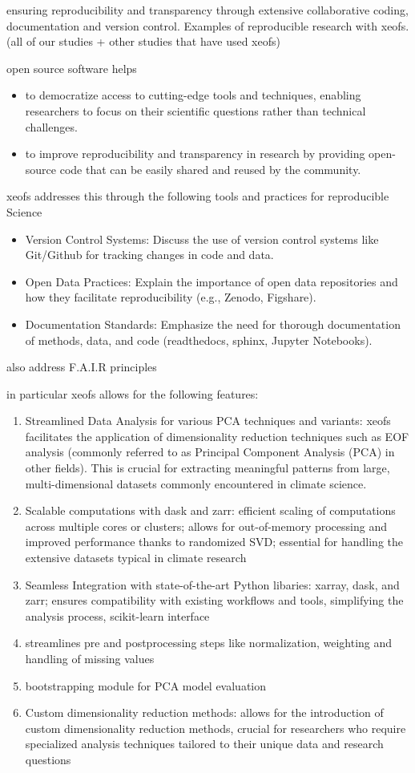 ensuring reproducibility and transparency through extensive collaborative coding, documentation and version control.
Examples of reproducible research with xeofs. (all of our studies + other studies that have used xeofs)


open source software helps 
\begin{itemize}
    \item to democratize access to cutting-edge tools and techniques, enabling researchers to focus on their scientific questions rather than technical challenges.
    \item to improve reproducibility and transparency in research by providing open-source code that can be easily shared and reused by the community.
\end{itemize}


xeofs addresses this through the following tools and practices for reproducible Science
\begin{itemize}
    \item Version Control Systems: Discuss the use of version control systems like Git/Github for tracking changes in code and data.
    \item Open Data Practices: Explain the importance of open data repositories and how they facilitate reproducibility (e.g., Zenodo, Figshare).
    \item Documentation Standards: Emphasize the need for thorough documentation of methods, data, and code (readthedocs, sphinx, Jupyter Notebooks).
\end{itemize}
also address F.A.I.R principles


in particular xeofs allows for the following features:
\begin{enumerate}
    \item Streamlined Data Analysis for various PCA techniques and variants: xeofs facilitates the application of dimensionality reduction techniques such as EOF analysis (commonly referred to as Principal Component Analysis (PCA) in other fields). This is crucial for extracting meaningful patterns from large, multi-dimensional datasets commonly encountered in climate science.
    \item Scalable computations with dask and zarr: efficient scaling of computations across multiple cores or clusters; allows for out-of-memory processing and improved performance thanks to randomized SVD; essential for handling the extensive datasets typical in climate research
    \item Seamless Integration with state-of-the-art Python libaries: xarray, dask, and zarr; ensures compatibility with existing workflows and tools, simplifying the analysis process, scikit-learn interface
    \item streamlines pre and postprocessing steps like normalization, weighting and handling of missing values
    \item bootstrapping module for PCA model evaluation
    \item Custom dimensionality reduction methods: allows for the introduction of custom dimensionality reduction methods, crucial for researchers who require specialized analysis techniques tailored to their unique data and research questions
\end{enumerate}



